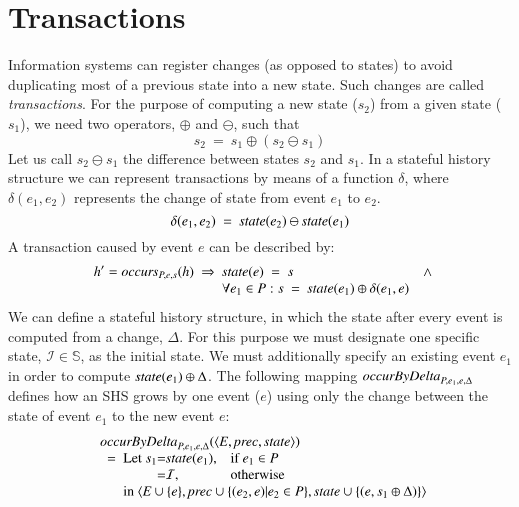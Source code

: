 \documentclass{elsarticle}
\def\id#1{\text{\em #1\/}}
\def\Events{{\mathit E}}
\begin{document}
\section{Transactions}
\label{sct:Transactions}
	Information systems can register changes (as opposed to states) to avoid duplicating most of a previous state into a new state.
	Such changes are called {\em transactions}.
	For the purpose of computing a new state ($s_2$) from a given state ($s_1$),
	we need two operators, $\oplus$ and $\ominus$, such that
\begin{equation}
	s_2\ =\ s_1\oplus(s_2\ominus s_1)
\label{req:oplus and ominus}
\end{equation}
	Let us call $s_2\ominus s_1$ the difference between states $s_2$ and $s_1$.
	In a stateful history structure we can represent transactions by means of a function $\delta$,
	where $\delta(e_1,e_2)$ represents the change of state from event $e_1$ to $e_2$.
\begin{equation}
	\delta(e_1,e_2)\ =\ \id{state}(e_2)\ominus\id{state}(e_1)
\label{def:delta}
\end{equation}
	A transaction caused by event $e$ can be described by:
\begin{eqnarray}
&&	h'=\id{occurs}_{P,e,s}(h)\ \Rightarrow\ \begin{array}[t]{@{}ll}
		\id{state}(e)\ =\ s&\wedge\\
		\forall e_1\in P: s\ =\ \id{state}(e_1)\oplus\delta(e_1,e)
	\end{array}
\label{req:transaction}
\end{eqnarray}
	We can define a stateful history structure,
	in which the state after every event is computed from a change, $\Delta$.
	For this purpose we must designate one specific state, $\mathcal I\in\mathbb S$, as the initial state.
	We must additionally specify an existing event $e_1$ in order to compute $\id{state}(e_1)\oplus\Delta$.
	The following mapping $\id{occurByDelta}_{P,e_1,e,\Delta}$ defines how an SHS grows by one event ($e$)
	using only the change between the state of event $e_1$ to the new event $e$:
\begin{eqnarray}
&&\begin{array}{l}
	\id{occurByDelta}_{P,e_1,e,\Delta}(\la\Events, \id{prec}, \id{state}\ra)\\
	\ \ =\ \begin{array}[t]{@{}l@{}c@{}ll}
		\text{Let }s_1&=&\id{state}(e_1)\text{,}&\text{if }e_1\in P\\
				&=&\mathcal I\text{,}&\text{otherwise}\\
		\multicolumn{4}{@{}l}{\text{in }\la\Events\cup\{e\}, \id{prec}\cup\{(e_2,e)|e_2\in P\}, \id{state}\cup\{(e,s_1\oplus\Delta)\}\ra}
		\end{array}
\end{array}
\label{req:SHS by Delta}
\end{eqnarray}
\end{document}

